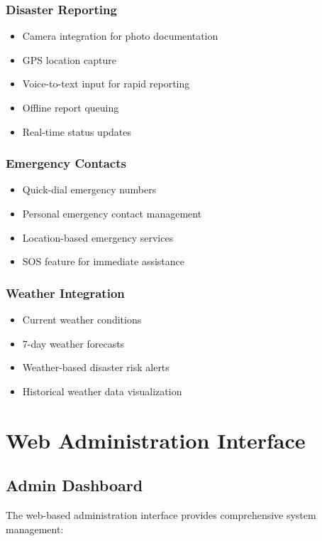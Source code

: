 \documentclass[12pt,a4paper]{article}
\begin{document}
\subsubsection{Disaster Reporting}
\begin{itemize}
    \item Camera integration for photo documentation
    \item GPS location capture
    \item Voice-to-text input for rapid reporting
    \item Offline report queuing
    \item Real-time status updates
\end{itemize}

\subsubsection{Emergency Contacts}
\begin{itemize}
    \item Quick-dial emergency numbers
    \item Personal emergency contact management
    \item Location-based emergency services
    \item SOS feature for immediate assistance
\end{itemize}

\subsubsection{Weather Integration}
\begin{itemize}
    \item Current weather conditions
    \item 7-day weather forecasts
    \item Weather-based disaster risk alerts
    \item Historical weather data visualization
\end{itemize}

\section{Web Administration Interface}

\subsection{Admin Dashboard}

The web-based administration interface provides comprehensive system management:
\end{document}
